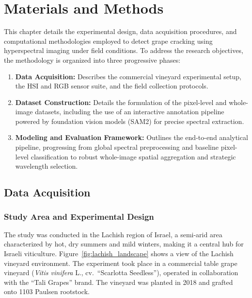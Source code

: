 ﻿\chapter{Materials and Methods}
\label{ch:materials_methods}

\noindent
This chapter details the experimental design, data acquisition procedures, and computational methodologies employed to detect grape cracking using hyperspectral imaging under field conditions. To address the research objectives, the methodology is organized into three progressive phases:

\begin{enumerate}
    \item \textbf{Data Acquisition:} Describes the commercial vineyard experimental setup, the HSI and RGB sensor suite, and the field collection protocols.
    \item \textbf{Dataset Construction:} Details the formulation of the pixel-level and whole-image datasets, including the use of an interactive annotation pipeline powered by foundation vision models (SAM2) for precise spectral extraction.
    \item \textbf{Modeling and Evaluation Framework:} Outlines the end-to-end analytical pipeline, progressing from global spectral preprocessing and baseline pixel-level classification to robust whole-image spatial aggregation and strategic wavelength selection.
\end{enumerate}

\medskip
\section{Data Acquisition}

\subsection{Study Area and Experimental Design}

\noindent
The study was conducted in the Lachish region of Israel, a semi-arid area characterized by hot, dry summers and mild winters, making it a central hub for Israeli viticulture. Figure~\ref{fig:lachish_landscape} shows a view of the Lachish vineyard environment. The experiment took place in a commercial table grape vineyard (\textit{Vitis vinifera} L., cv.\ ``Scarlotta Seedless''), operated in collaboration with the ``Tali Grapes'' brand. The vineyard was planted in 2018 and grafted onto 1103 Paulsen rootstock.

